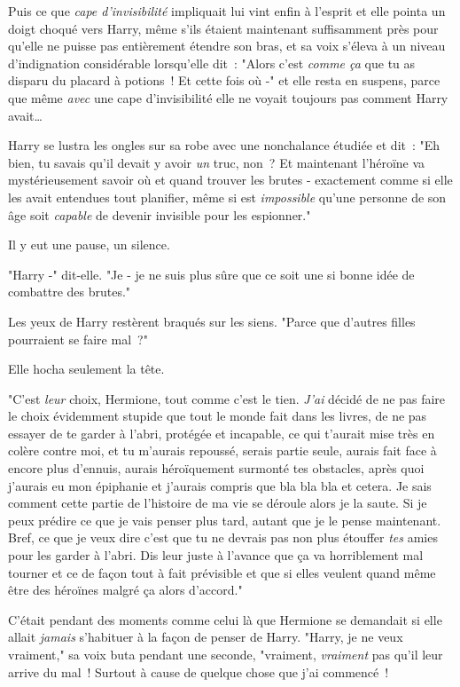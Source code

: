 Puis ce que \emph{cape d'invisibilité} impliquait lui vint enfin à l'esprit et elle pointa un doigt choqué vers Harry, même s'ils étaient maintenant suffisamment près pour qu'elle ne puisse pas entièrement étendre son bras, et sa voix s'éleva à un niveau d'indignation considérable lorsqu'elle dit~: "Alors c'est \emph{comme ça} que tu as disparu du placard à potions~! Et cette fois où -" et elle resta en suspens, parce que même \emph{avec} une cape d'invisibilité elle ne voyait toujours pas comment Harry avait…

Harry se lustra les ongles sur sa robe avec une nonchalance étudiée et dit~: "Eh bien, tu savais qu'il devait y avoir \emph{un} truc, non~? Et maintenant l'héroïne va mystérieusement savoir où et quand trouver les brutes - exactement comme si elle les avait entendues tout planifier, même si est \emph{impossible} qu'une personne de son âge soit \emph{capable} de devenir invisible pour les espionner."

Il y eut une pause, un silence.

"Harry -" dit-elle. "Je - je ne suis plus sûre que ce soit une si bonne idée de combattre des brutes."

Les yeux de Harry restèrent braqués sur les siens. "Parce que d'autres filles pourraient se faire mal~?"

Elle hocha seulement la tête.

"C'est \emph{leur} choix, Hermione, tout comme c'est le tien. \emph{J'ai} décidé de ne pas faire le choix évidemment stupide que tout le monde fait dans les livres, de ne pas essayer de te garder à l'abri, protégée et incapable, ce qui t'aurait mise très en colère contre moi, et tu m'aurais repoussé, serais partie seule, aurais fait face à encore plus d'ennuis, aurais héroïquement surmonté tes obstacles, après quoi j'aurais eu mon épiphanie et j'aurais compris que bla bla bla et cetera. Je sais comment cette partie de l'histoire de ma vie se déroule alors je la saute. Si je peux prédire ce que je vais penser plus tard, autant que je le pense maintenant. Bref, ce que je veux dire c'est que tu ne devrais pas non plus étouffer \emph{tes} amies pour les garder à l'abri. Dis leur juste à l'avance que ça va horriblement mal tourner et ce de façon tout à fait prévisible et que si elles veulent quand même être des héroïnes malgré ça alors d'accord."

C'était pendant des moments comme celui là que Hermione se demandait si elle allait \emph{jamais} s'habituer à la façon de penser de Harry. "Harry, je ne veux vraiment," sa voix buta pendant une seconde, "vraiment, \emph{vraiment} pas qu'il leur arrive du mal~! Surtout à cause de quelque chose que j'ai commencé~!

